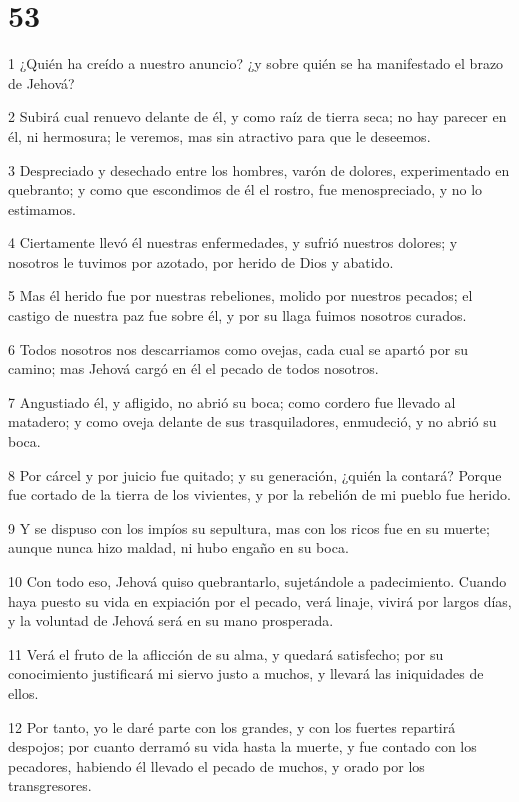 \chapter{53}

\par 1 ¿Quién ha creído a nuestro anuncio? ¿y sobre quién se ha manifestado el brazo de Jehová?
\par 2 Subirá cual renuevo delante de él, y como raíz de tierra seca; no hay parecer en él, ni hermosura; le veremos, mas sin atractivo para que le deseemos.
\par 3 Despreciado y desechado entre los hombres, varón de dolores, experimentado en quebranto; y como que escondimos de él el rostro, fue menospreciado, y no lo estimamos.
\par 4 Ciertamente llevó él nuestras enfermedades, y sufrió nuestros dolores; y nosotros le tuvimos por azotado, por herido de Dios y abatido.
\par 5 Mas él herido fue por nuestras rebeliones, molido por nuestros pecados; el castigo de nuestra paz fue sobre él, y por su llaga fuimos nosotros curados. 
\par 6 Todos nosotros nos descarriamos como ovejas, cada cual se apartó por su camino; mas Jehová cargó en él el pecado de todos nosotros.
\par 7 Angustiado él, y afligido, no abrió su boca; como cordero fue llevado al matadero; y como oveja delante de sus trasquiladores, enmudeció, y no abrió su boca.
\par 8 Por cárcel y por juicio fue quitado; y su generación, ¿quién la contará? Porque fue cortado de la tierra de los vivientes, y por la rebelión de mi pueblo fue herido.
\par 9 Y se dispuso con los impíos su sepultura, mas con los ricos fue en su muerte; aunque nunca hizo maldad, ni hubo engaño en su boca. 
\par 10 Con todo eso, Jehová quiso quebrantarlo, sujetándole a padecimiento. Cuando haya puesto su vida en expiación por el pecado, verá linaje, vivirá por largos días, y la voluntad de Jehová será en su mano prosperada.
\par 11 Verá el fruto de la aflicción de su alma, y quedará satisfecho; por su conocimiento justificará mi siervo justo a muchos, y llevará las iniquidades de ellos.
\par 12 Por tanto, yo le daré parte con los grandes, y con los fuertes repartirá despojos; por cuanto derramó su vida hasta la muerte, y fue contado con los pecadores, habiendo él llevado el pecado de muchos, y orado por los transgresores.

